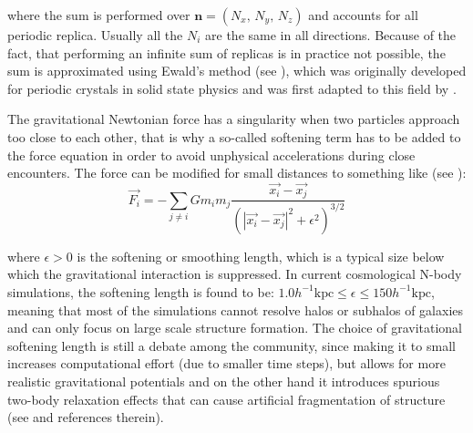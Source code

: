 where the sum is performed over $\mathbf{n}=(N_{x},\,N_{y},\,N_{z})$
and accounts for all periodic replica. Usually all the $N_{i}$ are
the same in all directions. Because of the fact, that performing an
infinite sum of replicas is in practice not possible, the sum is approximated
using Ewald's method (see \citet{ewald_berechnung_1921}), which was
originally developed for periodic crystals in solid state physics
and was first adapted to this field by \citet{hernquist_application_1991}.

The gravitational Newtonian force has a singularity when two particles
approach too close to each other, that is why a so-called softening
term has to be added to the force equation in order to avoid unphysical
accelerations during close encounters. The force can be modified for
small distances to something like (see \citet{trenti_gravitational_2008}):
\begin{equation}
\vec{F_{i}}=-\sum_{j\neq i}Gm_{i}m_{j}\frac{\vec{x_{i}}-\vec{x_{j}}}{\left(\left|\vec{x_{i}}-\vec{x_{j}}\right|^{2}+\epsilon^{2}\right)^{3/2}}
\end{equation}


where $\epsilon>0$ is the softening or smoothing length, which is
a typical size below which the gravitational interaction is suppressed.
In current cosmological N-body simulations, the softening length is
found to be: $1.0h^{-1}\mbox{kpc}\leq\epsilon\leq150h^{-1}\mbox{kpc}$,
meaning that most of the simulations cannot resolve halos or subhalos
of galaxies and can only focus on large scale structure formation.
The choice of gravitational softening length is still a debate among
the community, since making it to small increases computational effort
(due to smaller time steps), but allows for more realistic gravitational
potentials and on the other hand it introduces spurious two-body relaxation
effects that can cause artificial fragmentation of structure (see
\citet{kuhlen_numerical_2012} and references therein).

